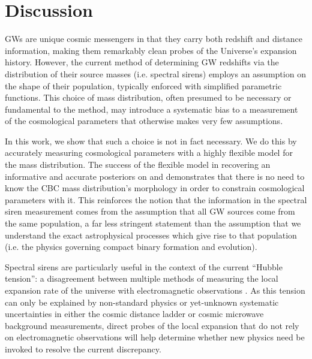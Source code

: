 \documentclass[preprint2,linenumbers]{aastex631}
\begin{document}
\section{Discussion}
\label{sec:discussion}

\acp{GW} are unique cosmic messengers in that they carry both redshift and distance information, making them remarkably clean probes of the Universe's expansion history. 
However, the current method of determining \ac{GW} redshifts via the distribution of their source masses (i.e. spectral sirens) employs an assumption on the shape of their population, typically enforced with simplified parametric functions. 
This choice of mass distribution, often presumed to be necessary or fundamental to the method, may introduce a systematic bias to a measurement of the cosmological parameters that otherwise makes very few assumptions.
    
In this work, we show that such a choice is not in fact necessary.
We do this by accurately measuring cosmological parameters with a highly flexible model for the mass distribution. 
The success of the flexible model in recovering an informative and accurate posteriors on \Ho{} and \Omm{} demonstrates that there is no need to know the \ac{CBC} mass distribution's morphology in order to constrain cosmological parameters with it.
This reinforces the notion that the information in the spectral siren measurement comes from the assumption that all \ac{GW} sources come from the same population, a far less stringent statement than the assumption that we understand the exact astrophysical processes which give rise to that population (i.e. the physics governing compact binary formation and evolution).

Spectral sirens are particularly useful in the context of the current ``Hubble tension'': a disagreement between multiple methods of measuring the local expansion rate of the universe with electromagnetic observations \citep{freedman_measurements_2021}.
As this tension can only be explained by non-standard physics or yet-unknown systematic uncertainties in either the cosmic distance ladder or cosmic microwave background measurements, direct probes of the local expansion that do not rely on electromagnetic observations will help determine whether new physics need be invoked to resolve the current discrepancy.
    
\end{document}
